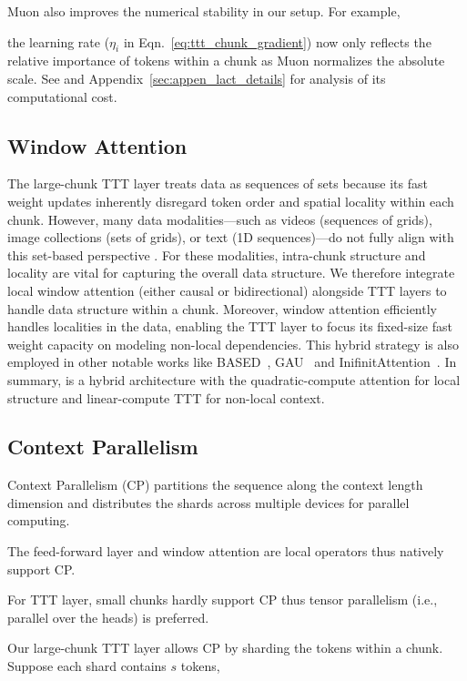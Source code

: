 \documentclass{article}
\begin{document}
Muon also improves the numerical stability in our setup. 
For example, 

the learning rate  ($\eta_i$ in Eqn.~\ref{eq:ttt_chunk_gradient}) now only reflects the relative importance of tokens within a chunk as Muon normalizes the absolute scale. See \cite{jordan2024muon} and Appendix~\ref{sec:appen_lact_details} for analysis of its computational cost. 

\subsection{Window Attention}
The large-chunk TTT layer treats data as sequences of sets because its fast weight updates inherently disregard token order and spatial locality within each chunk.
However, many data modalities—such as videos (sequences of grids), image collections (sets of grids), or text (1D sequences)—do not fully align with this set-based perspective .
For these modalities, intra-chunk structure and locality are vital for capturing the overall data structure. We therefore integrate local window attention (either causal or bidirectional) alongside TTT layers to handle data structure within a chunk. Moreover, window attention efficiently handles localities in the data, enabling the TTT layer to focus its fixed-size fast weight capacity on modeling non-local dependencies. This hybrid strategy is also employed in other notable works like BASED~\cite{arora2024simple}, GAU~\cite{hua2022transformer} and InifinitAttention~\cite{munkhdalai2024leavecontextbehindefficient}. 
In summary, \methodname{} is a hybrid architecture with the quadratic-compute attention for local structure and linear-compute TTT for non-local context.

\subsection{Context Parallelism}
\label{sec:parallelism}

Context Parallelism (CP) partitions the sequence along the context length dimension and distributes the shards across multiple devices for parallel computing.

The feed-forward layer and window attention are local operators thus natively support CP.

For TTT layer, small chunks hardly support CP thus tensor parallelism (i.e., parallel over the heads) is preferred.

Our large-chunk TTT layer allows CP by sharding the tokens within a chunk.
Suppose each shard contains $s$ tokens,
\end{document}
